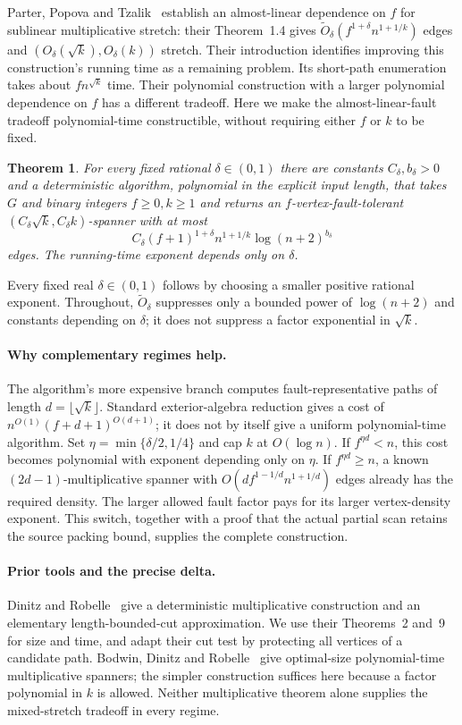 \documentclass[acmsmall,11pt,screen,nonacm]{acmart}
\newcommand{\Ot}{\widetilde{O}}
\newtheorem{theorem}{Theorem}[section]
\begin{document}
Parter, Popova and Tzalik~\cite{PPT26} establish an almost-linear dependence
on $f$ for sublinear multiplicative stretch: their Theorem~1.4 gives
$\Ot_\delta(f^{1+\delta}n^{1+1/k})$ edges and
$(O_\delta(\sqrt{k}),O_\delta(k))$ stretch. Their introduction identifies
improving this construction's running time as a remaining problem. Its
short-path enumeration takes about $fn^{\sqrt{k}}$ time. Their polynomial
construction with a larger polynomial dependence on $f$ has a different
tradeoff. Here we make the almost-linear-fault tradeoff polynomial-time
constructible, without requiring either $f$ or $k$ to be fixed.

\begin{theorem}\label{thm:main}
For every fixed rational $\delta\in(0,1)$ there are constants
$C_\delta,b_\delta>0$ and a deterministic algorithm, polynomial in the
explicit input length, that takes $G$ and binary integers $f\ge0,k\ge1$
and returns an $f$-vertex-fault-tolerant
$(C_\delta\sqrt{k},C_\delta k)$-spanner with at most
\[
 C_\delta(f+1)^{1+\delta}n^{1+1/k}\log(n+2)^{b_\delta}
\]
edges. The running-time exponent depends only on $\delta$.
\end{theorem}

Every fixed real $\delta\in(0,1)$ follows by choosing a smaller positive
rational exponent. Throughout, $\Ot_\delta$ suppresses only a bounded
power of $\log(n+2)$ and constants depending on $\delta$; it does not
suppress a factor exponential in $\sqrt{k}$.

\paragraph{Why complementary regimes help.}
The algorithm's more expensive branch computes fault-representative paths
of length $d=\lfloor\sqrt{k}\rfloor$. Standard exterior-algebra reduction
gives a cost of $n^{O(1)}(f+d+1)^{O(d+1)}$; it does not by itself give a
uniform polynomial-time algorithm. Set $\eta=\min\{\delta/2,1/4\}$ and
cap $k$ at $O(\log n)$. If $f^{\eta d}<n$, this cost becomes polynomial
with exponent depending only on $\eta$. If $f^{\eta d}\ge n$, a known
$(2d-1)$-multiplicative spanner with
$O(df^{1-1/d}n^{1+1/d})$ edges already has the required density. The
larger allowed fault factor pays for its larger vertex-density exponent.
This switch, together with a proof that the actual partial scan retains
the source packing bound, supplies the complete construction.

\paragraph{Prior tools and the precise delta.}
Dinitz and Robelle~\cite{DR20} give a deterministic multiplicative
construction and an elementary length-bounded-cut approximation. We use
their Theorems~2 and~9 for size and time, and adapt their cut test by
protecting all vertices of a candidate path. Bodwin, Dinitz and
Robelle~\cite{BDR21} give optimal-size polynomial-time multiplicative
spanners; the simpler construction suffices here because a factor
polynomial in $k$ is allowed. Neither multiplicative theorem alone supplies
the mixed-stretch tradeoff in every regime.
\end{document}
